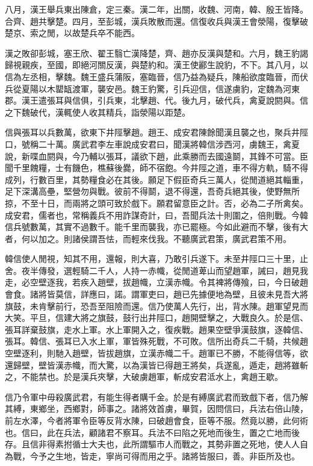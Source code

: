 八月，漢王舉兵東出陳倉，定三秦。漢二年，出關，收魏、河南，韓、殷王皆降。合齊、趙共擊楚。四月，至彭城，漢兵敗散而還。信復收兵與漢王會滎陽，復擊破楚京、索之閒，以故楚兵卒不能西。

漢之敗卻彭城，塞王欣、翟王翳亡漢降楚，齊、趙亦反漢與楚和。六月，魏王豹謁歸視親疾，至國，即絕河關反漢，與楚約和。漢王使酈生說豹，不下。其八月，以信為左丞相，擊魏。魏王盛兵蒲阪，塞臨晉，信乃益為疑兵，陳船欲度臨晉，而伏兵從夏陽以木罌缻渡軍，襲安邑。魏王豹驚，引兵迎信，信遂虜豹，定魏為河東郡。漢王遣張耳與信俱，引兵東，北擊趙、代。後九月，破代兵，禽夏說閼與。信之下魏破代，漢輒使人收其精兵，詣滎陽以距楚。

信與張耳以兵數萬，欲東下井陘擊趙。趙王、成安君陳餘聞漢且襲之也，聚兵井陘口，號稱二十萬。廣武君李左車說成安君曰，聞漢將韓信涉西河，虜魏王，禽夏說，新喋血閼與，今乃輔以張耳，議欲下趙，此乘勝而去國遠鬬，其鋒不可當。臣聞千里餽糧，士有饑色，樵蘇後爨，師不宿飽。今井陘之道，車不得方軌，騎不得成列，行數百里，其勢糧食必在其後。願足下假臣奇兵三萬人，從閒道絕其輜重，足下深溝高壘，堅營勿與戰。彼前不得鬬，退不得還，吾奇兵絕其後，使野無所掠，不至十日，而兩將之頭可致於戲下。願君留意臣之計。否，必為二子所禽矣。成安君，儒者也，常稱義兵不用詐謀奇計，曰，吾聞兵法十則圍之，倍則戰。今韓信兵號數萬，其實不過數千。能千里而襲我，亦已罷極。今如此避而不擊，後有大者，何以加之。則諸侯謂吾怯，而輕來伐我。不聽廣武君策，廣武君策不用。

韓信使人閒視，知其不用，還報，則大喜，乃敢引兵遂下。未至井陘口三十里，止舍。夜半傳發，選輕騎二千人，人持一赤幟，從閒道萆山而望趙軍，誡曰，趙見我走，必空壁逐我，若疾入趙壁，拔趙幟，立漢赤幟。令其裨將傳飱，曰，今日破趙會食。諸將皆莫信，詳應曰，諾。謂軍吏曰，趙已先據便地為壁，且彼未見吾大將旗鼓，未肯擊前行，恐吾至阻險而還。信乃使萬人先行，出，背水陳。趙軍望見而大笑。平旦，信建大將之旗鼓，鼓行出井陘口，趙開壁擊之，大戰良久。於是信、張耳詳棄鼓旗，走水上軍。水上軍開入之，復疾戰。趙果空壁爭漢鼓旗，逐韓信、張耳。韓信、張耳已入水上軍，軍皆殊死戰，不可敗。信所出奇兵二千騎，共候趙空壁逐利，則馳入趙壁，皆拔趙旗，立漢赤幟二千。趙軍已不勝，不能得信等，欲還歸壁，壁皆漢赤幟，而大驚，以為漢皆已得趙王將矣，兵遂亂，遁走，趙將雖斬之，不能禁也。於是漢兵夾擊，大破虜趙軍，斬成安君泜水上，禽趙王歇。

信乃令軍中毋殺廣武君，有能生得者購千金。於是有縛廣武君而致戲下者，信乃解其縛，東鄉坐，西鄉對，師事之。諸將效首虜，畢賀，因問信曰，兵法右倍山陵，前左水澤，今者將軍令臣等反背水陳，曰破趙會食，臣等不服。然竟以勝，此何術也。信曰，此在兵法，顧諸君不察耳。兵法不曰陷之死地而後生，置之亡地而後存。且信非得素拊循士大夫也，此所謂驅市人而戰之，其勢非置之死地，使人人自為戰，今予之生地，皆走，寧尚可得而用之乎。諸將皆服曰，善。非臣所及也。

